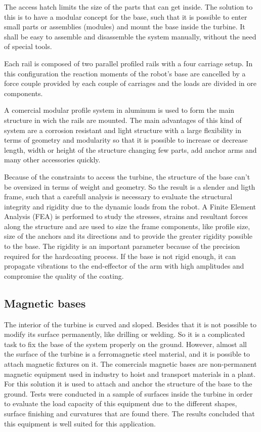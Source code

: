 The access hatch limits the size of the parts that can get
inside. The solution to this is to have a modular concept for the base, such
that it is possible to enter small parts or assemblies (modules) and mount
the base inside the turbine. It shall be easy to assemble and disassemble the
system manually, without the need of special tools. 

Each rail is composed of two parallel profiled rails with a four carriage setup.
In this configuration the reaction moments of the robot's base are cancelled by
a force couple provided by each couple of carriages and the loads are divided in
ore components.

A comercial modular profile system in aluminum is used to form the main
structure in wich the rails are mounted. 
The main advantages of this kind of system are a corrosion resistant and light
structure with a large flexibility in terms of geometry and modularity so that
it is possible to increase or decrease length, width or height of the structure
changing few parts, add anchor arms and many other accessories quickly.

Because of the constraints to access the turbine, the structure of the base
can't be oversized in terms of weight and geometry. So the result is a slender 
and ligth frame, such that a carefull analysis is necessary to evaluate the
structural integrity and rigidity due to the dynamic loads from the robot.
A Finite Element Analysis (FEA) is performed to study the stresses, strains and
resultant forces along the structure and are used to size the frame components,
like profile size, size of the anchors and its directions and to provide the
greater rigidity possible to the base. The rigidity is an important parameter
because of the precision required for the hardcoating process. If the base is
not rigid enough, it can propagate vibrations to the end-effector of the
arm with high amplitudes and compromise the quality of the coating.


\subsection{Magnetic bases}

The interior of the turbine is curved and sloped. Besides that it is not
possible to modify its surface permanently, like drilling or welding. 
So it is a complicated task to fix the base of the system properly on the
ground.
However, almost all the surface of the turbine is a ferromagnetic steel
material, and it is possible to attach magnetic fixtures on it.
The comercials magnetic bases are non-permanent magnetic equipment used in
industry to hoist and transport materials in a plant. 
For this solution it is used to attach and anchor the structure of the base to
the ground. 
Tests were conducted in a sample of surfaces inside the turbine in order to
evaluate the load capacity of this equipment due to the different shapes,
surface finishing and curvatures that are found there.
The results concluded that this equipment is well suited for this application.



